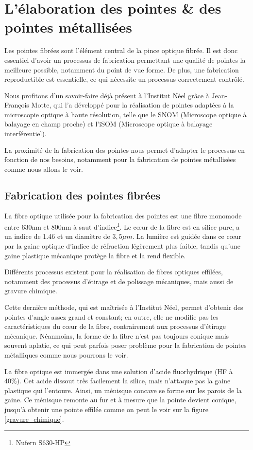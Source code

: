 \section{L'élaboration des pointes \& des pointes métallisées}\label{sec:fab_pointes}
Les pointes fibrées sont l'élément central de la pince optique fibrée. Il est donc essentiel d'avoir un processus de fabrication permettant une qualité de pointes la meilleure possible, notamment du point de vue forme. De plus, une fabrication reproductible est essentielle, ce qui nécessite un processus correctement contrôlé.

Nous profitons d'un savoir-faire déjà présent à l'Institut Néel grâce à Jean-François Motte, qui l'a développé pour la réalisation de pointes adaptées à la microscopie optique à haute résolution, telle que le SNOM (Microscope optique à balayage en champ proche) et l'iSOM (Microscope optique à balayage interférentiel).

La proximité de la fabrication des pointes nous permet d'adapter le processus en fonction de nos besoins, notamment pour la fabrication de pointes métallisées comme nous allons le voir.

\subsection{Fabrication des pointes fibrées}
La fibre optique utilisée pour la fabrication des pointes est une fibre monomode entre 630nm et 800nm à saut d'indice\footnote{Nufern S630-HP}. Le cœur de la fibre est en silice pure, a un indice de 1.46 et un diamètre de $3,5\mu m$. La lumière est guidée dans ce cœur par la gaine optique d'indice de réfraction légèrement plus faible, tandis qu'une gaine plastique mécanique protège la fibre et la rend flexible.

Différents processus existent pour la réalisation de fibres optiques effilées, notamment des processus d'étirage et de polissage mécaniques, mais aussi de gravure chimique. 

Cette dernière méthode, qui est maîtrisée à l'Institut Néel, permet d'obtenir des pointes d'angle assez grand et constant; en outre, elle ne modifie pas les caractéristiques du cœur de la fibre, contrairement aux processus d'étirage mécanique. Néanmoins, la forme de la fibre n'est pas toujours conique mais souvent aplatie, ce qui peut parfois poser problème pour la fabrication de pointes métalliques comme nous pourrons le voir.

La fibre optique est immergée dans une solution d'acide fluorhydrique (HF à 40\%). Cet acide dissout très facilement la silice, mais n'attaque pas la gaine plastique qui l'entoure. Ainsi, un ménisque concave se forme sur les parois de la gaine. Ce ménisque remonte au fur et à mesure que la pointe devient conique, jusqu'à obtenir une pointe effilée comme on peut le voir sur la figure \ref{gravure_chimique}.

